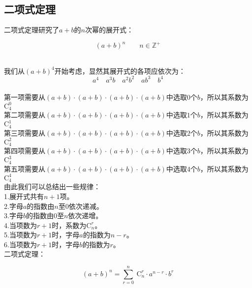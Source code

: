 \documentclass[UTF8]{ctexart}
\begin{document}
\newpage

    \subsection{二项式定理}
    二项式定理研究了$a+b$的$n$次幂的展开式：
    \begin{large}
        \begin{equation*}
            (a+b)^n\qquad n\in\mathbb{Z^+}
        \end{equation*}
    \end{large}\\
    \setcounter{equation}{0}
    我们从$(a+b)^4$开始考虑，显然其展开式的各项应依次为：
    \begin{equation}
        a^4\quad a^3b\quad a^2b^2\quad ab^3\quad b^4
    \end{equation}\\
    第一项需要从$(a+b)\cdot(a+b)\cdot(a+b)\cdot(a+b)$中选取$0$个$b$，所以其系数为$\mathrm{C}_4^0$\\[1mm]
    第二项需要从$(a+b)\cdot(a+b)\cdot(a+b)\cdot(a+b)$中选取$1$个$b$，所以其系数为$\mathrm{C}_4^1$\\[1mm]
    第三项需要从$(a+b)\cdot(a+b)\cdot(a+b)\cdot(a+b)$中选取$2$个$b$，所以其系数为$\mathrm{C}_4^2$\\[1mm]
    第四项需要从$(a+b)\cdot(a+b)\cdot(a+b)\cdot(a+b)$中选取$3$个$b$，所以其系数为$\mathrm{C}_4^3$\\[1mm]
    第五项需要从$(a+b)\cdot(a+b)\cdot(a+b)\cdot(a+b)$中选取$4$个$b$，所以其系数为$\mathrm{C}_4^4$\\[5mm]
    由此我们可以总结出一些规律：\\[3mm]
    1.展开式共有$n+1$项。\\[3mm]
    2.字母$a$的指数由$n$至$0$依次递减。\\[3mm]
    3.字母$b$的指数由$0$至$n$依次递增。\\[3mm]
    4.当项数为$r+1$时，系数为$\mathrm{C}_{n}^{r}$。\\[3mm]
    5.当项数为$r+1$时，字母$a$的指数为$n-r$。\\[3mm]
    6.当项数为$r+1$时，字母$b$的指数为$r$。\\[6mm]
    二项式定理：
    \begin{large}
        \begin{equation*}
            (a+b)^n=\sum_{r=0}^{n}~\mathrm{C}_n^r\cdot a^{n-r}\cdot b^r
        \end{equation*}
    \end{large}\\
\end{document}

